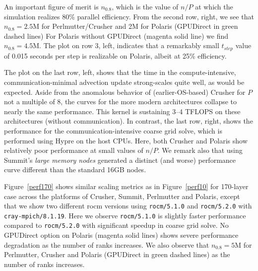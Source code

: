 An important figure of merit is $n_{0.8}$, which is the value of $n/P$ at which
the simulation realizes 80\% parallel efficiency.  From the second row, right,
we see that $n_{0.8}=2.5$M for Perlmutter/Crusher and 2M for Polaris (GPUDirect in green dashed lines)
For Polaris without GPUDirect (magenta solid line) we find $n_{0.8}=4.5$M.
The plot on row 3, left, indicates that a remarkably small $t_{step}$ value of
0.015 seconds per step is realizable on Polaris, albeit at 25\% efficiency.

The plot on the last row, left, shows that the time in the compute-intensive,
communication-minimal advection update strong-scales quite well, as would be
expected.  Aside from the anomalous behavior of (earlier-OS-based) Crusher
for $P$ not a multiple of 8, the curves for the more modern architectures 
collapse to nearly the same performance.  This kernel is sustaining 3--4 TFLOPS
on these architectures (without communication).
  In contrast, the last row, right, shows the performance for the
communication-intensive coarse grid solve, which is performed using Hypre
on the host CPUs.  Here, both Crusher and Polaris show relatively poor
performance at small values of $n/P$.  We remark also that using Summit's
{\em large memory nodes} generated a distinct (and worse) performance curve
different than the standard 16GB nodes.

Figure~\ref{perf170} shows similar scaling metrics as in Figure~\ref{perf10} 
for 170-layer case across the platforms of Crusher, Summit, Perlmutter and Polaris,
except that we show two different rocm versions using {\small\tt rocm/5.1.0} and {\small\tt rocm/5.2.0}
with {\small\tt cray-mpich/8.1.19}. Here we observe {\small\tt rocm/5.1.0} is slightly faster performance
compared to {\small\tt rocm/5.2.0} with significant speedup in coarse grid solve.
No GPUDirect option on Polaris (magenta solid lines) shows severe performance 
degradation as the number of ranks increases.
We also observe that $n_{0.8}=5$M for Perlmutter, Crusher and Polaris (GPUDirect in green dashed lines)
as the number of ranks increases. 


